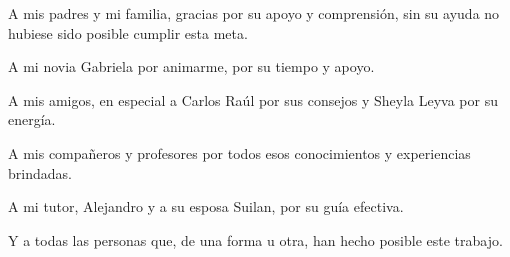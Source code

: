 \begin{acknowledgements}
A mis padres y mi familia, gracias por su apoyo y comprensión, sin su ayuda no hubiese sido posible cumplir esta meta.

A mi novia Gabriela por animarme, por su tiempo y apoyo.

A mis amigos, en especial a Carlos Raúl por sus consejos y Sheyla Leyva por su energía.

A mis compañeros y profesores por todos esos conocimientos y experiencias brindadas.

A mi tutor, Alejandro y a su esposa Suilan, por su guía efectiva.

Y a todas las personas que, de una forma u otra, han hecho posible este trabajo.
\end{acknowledgements}